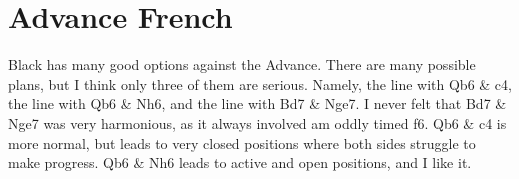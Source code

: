\section{Advance French}
Black has many good options against the Advance. There are many possible plans, but I think only three of them are serious. Namely, the line with Qb6 \& c4, the line with Qb6 \& Nh6, and the line with Bd7 \& Nge7.
I never felt that Bd7 \& Nge7 was very harmonious, as it always involved am oddly timed f6. Qb6 \& c4 is more normal, but leads to very closed positions where both sides struggle to make progress.
Qb6 \& Nh6 leads to active and open positions, and I like it.

